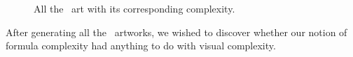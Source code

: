 \begin{figure}
\begin{center}
\begin{sideways}

\end{sideways}
\end{center}

\caption{All the \threexthree\ art with its corresponding complexity.}
\label{fig:3x3}
\end{figure}

After generating all the \threexthree\ artworks, we wished to discover whether
our notion of formula complexity had anything to do with visual complexity.

